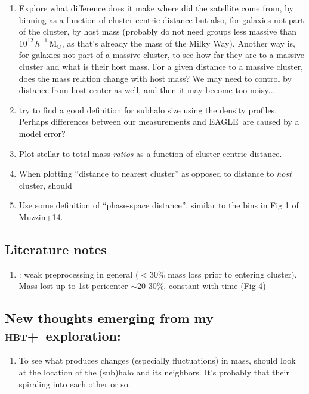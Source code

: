 \documentclass[usenatbib,fleqn]{mnras}
\newcommand{\eagle}{EAGLE}
\newcommand{\hbt}{\textsc{hbt+}}
\newcommand{\Msun}{\mathrm{M}_\odot}
\begin{document}
\begin{enumerate}
  \item Explore what difference does it make where did the satellite come from, by binning as a function of cluster-centric distance but also, for galaxies not part of the cluster, by host mass (probably do not need groups less massive than $10^{12}\,h^{-1}\,\Msun$, as that's already the mass of the Milky Way). Another way is, for galaxies not part of a massive cluster, to see how far they are to a massive cluster and what is their host mass. For a given distance to a massive cluster, does the mass relation change with host mass? We may need to control by distance from host center as well, and then it may become too noisy...
  \item try to find a good definition for subhalo size using the density profiles. Perhaps differences between our measurements and \eagle\ are caused by a model error?
  \item Plot stellar-to-total mass \emph{ratios} as a function of cluster-centric distance.
  \item When plotting ``distance to nearest cluster'' as opposed to distance to \emph{host} cluster, should 
  \item Use some definition of ``phase-space distance'', similar to the bins in Fig 1 of Muzzin+14.
\end{enumerate}

\subsection{Literature notes}

\begin{enumerate}
  \item \citet{rhee17}: weak preprocessing in general ($<30\%$ mass loss prior to entering cluster). Mass lost up to 1st pericenter $\sim$20-30\%, constant with time (Fig 4)
\end{enumerate}

\subsection{New thoughts emerging from my \hbt\ exploration:}
\begin{enumerate}
  \item To see what produces changes (especially fluctuations) in mass, should look at the location of the (sub)halo and its neighbors. It's probably that their spiraling into each other or so.
\end{enumerate}
\end{document}
